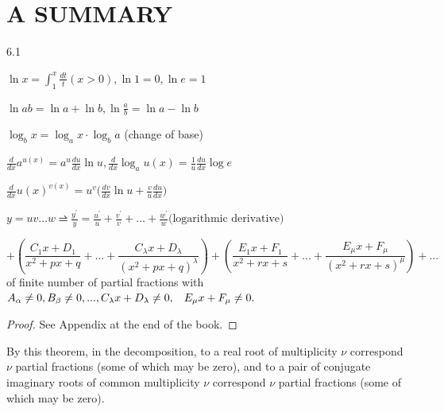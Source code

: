 \documentclass[11pt]{amsbook}
\begin{document}
\section*{A SUMMARY}
\begin{notbottom}
    \begin{hEnumerateArabic}
        \item[6.1]
            \begin{hEnumerateAlpha}{}
                \item[] \(\ln x = \int_{1}^{x} \frac{dt}{t} (x > 0), \ln 1 = 0, \ln e = 1 \)
                \item[] \(\ln ab = \ln a + \ln b, \ln \frac{a}{b} = \ln a - \ln b\)
                \item[] \(\log_b x = \log_a x \cdot \log_b a\) (change of base)
                \item[] \(\frac{d}{dx} a^{u(x)} = a^u \frac{du}{dx} \ln u, \frac{d}{dx} \log_a u(x) = \frac{1}{u} \frac{du}{dx} \log e  \)
                \item[] \(\frac{d}{dx} u(x)^{v(x)} = u^v \big(\frac{dv}{dx} \ln u +  \frac{v}{u} \frac{du}{dx} \big)  \)
                \item[] \( y = uv \ldots w \rightbarharpoon \frac{y^\prime}{y} = \frac{u^\prime}{u} + \frac{v^\prime}{v} + \ldots + \frac{w^\prime}{w} \text{(logarithmic derivative)} \)
            \end{hEnumerateAlpha}
    \end{hEnumerateArabic}
\end{notbottom}
\[
	+(\frac{C_1x + D_1}{x^2+px+q} + ... + \frac{C_{\lambda}x + D_\lambda}{(x^2+px+q)^\lambda})+(\frac{E_1x+F_1}{x^2+rx+s}+...+\frac{E_\mu x+ F_\mu}{(x^2+rx+s)^\mu})+...
\]
of finite number of partial fractions with $A_\alpha \neq 0,  B_\beta \neq 0, ... ,C_\lambda x + D_\lambda \neq 0,\hspace{3mm}  E_\mu x + F_\mu \neq 0.$

\begin{proof}
	See Appendix at the end of the book.
\end{proof}

By this theorem, in the decomposition, to a real root of multiplicity $\nu$ correspond $\nu$ partial fractions (some of which may be zero), and to a pair of conjugate imaginary roots of common multiplicity $\nu$ correspond $\nu$ partial fractions (some of which may be zero).
\end{document}
